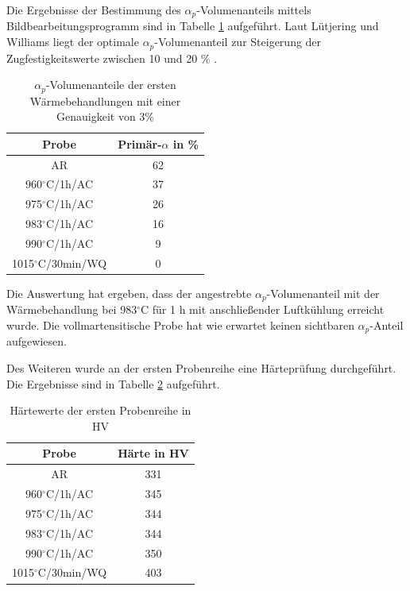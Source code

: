 Die Ergebnisse der Bestimmung des $\alpha_p$-Volumenanteils mittels Bildbearbeitungsprogramm sind in Tabelle \ref{Tabelle 4} aufgeführt. Laut Lütjering und Williams liegt der optimale $\alpha_p$-Volumenanteil zur Steigerung der Zugfestigkeitswerte zwischen 10 und 20 \% \cite{Lutjering.2007}.

\begin{table}[h]
	\centering
	\begin{tabular}{|c|c|}
		\hline 
		Probe & Primär-$\alpha$ in \% \\ 
		\hline 
		AR & 62 \\ 
		\hline 
		960$^\circ$C/1h/AC & 37 \\ 
		\hline 
		975$^\circ$C/1h/AC & 26 \\ 
		\hline 
		983$^\circ$C/1h/AC & 16 \\ 
		\hline 
		990$^\circ$C/1h/AC & 9 \\ 
		\hline 
		1015$^\circ$C/30min/WQ & 0 \\ 
		\hline 
	\end{tabular} 
	\caption{$\alpha_p$-Volumenanteile der ersten Wärmebehandlungen mit einer Genauigkeit von 3\%}
	\label{Tabelle 4}
\end{table}

Die Auswertung hat ergeben, dass der angestrebte $\alpha_p$-Volumenanteil mit der Wärmebehandlung bei 983$^\circ$C für 1 h mit anschließender Luftkühlung erreicht wurde. Die vollmartensitische Probe hat wie erwartet keinen sichtbaren $\alpha_p$-Anteil aufgewiesen.


Des Weiteren wurde an der ersten Probenreihe eine Härteprüfung durchgeführt. Die Ergebnisse sind in Tabelle \ref{Tabelle 5} aufgeführt. 

\begin{table}[h]
	\centering
	\begin{tabular}{|c|c|}
		\hline 
		Probe & Härte in HV \\ 
		\hline 
		AR & 331 \\ 
		\hline 
		960$^\circ$C/1h/AC & 345 \\ 
		\hline 
		975$^\circ$C/1h/AC & 344 \\ 
		\hline 
		983$^\circ$C/1h/AC & 344 \\ 
		\hline 
		990$^\circ$C/1h/AC & 350 \\ 
		\hline 
		1015$^\circ$C/30min/WQ & 403 \\ 
		\hline 
	\end{tabular} 
	\caption{Härtewerte der ersten Probenreihe in HV}
	\label{Tabelle 5}
\end{table}

